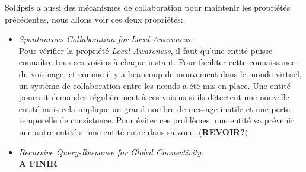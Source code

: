 Sollipsis a aussi des mécanismes de collaboration pour maintenir les propriétés précédentes, nous allons voir ces deux propriétés:
	\begin{itemize}
		\item \textit{Spontaneous Collaboration for Local Awareness:}\\
		Pour vérifier la propriété \textit{Local Awareness}, il faut qu'une entité puisse connaître tous ces voisins à chaque instant. Pour faciliter cette connaissance du voisinage, et comme il y a beaucoup de mouvement dans le monde virtuel, un système de collaboration entre les nœuds a été mis en place. Une entité pourrait demander régulièrement à ces voisins si ils détectent une nouvelle entité mais cela implique un grand nombre de message inutile et une perte temporelle de consistence. Pour éviter ces problèmes, une entité va prévenir une autre entité si une entité entre dans sa zone. (\textbf{REVOIR?}) 
		\item \textit{Recursive Query-Response for Global Connectivity:}\\
		\textbf{A FINIR}
	\end{itemize}
